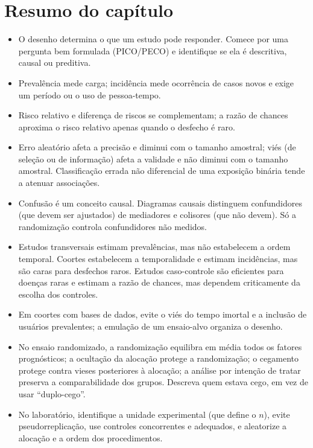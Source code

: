 \documentclass[
]{book}
\providecommand{\tightlist}{%
  \setlength{\itemsep}{0pt}\setlength{\parskip}{0pt}}
\begin{document}
\section{Resumo do capítulo}\label{resumo-do-capuxedtulo-2}

\begin{itemize}
\tightlist
\item
  O desenho determina o que um estudo pode responder. Comece por uma pergunta bem formulada (PICO/PECO) e identifique se ela é descritiva, causal ou preditiva.
\item
  Prevalência mede carga; incidência mede ocorrência de casos novos e exige um período ou o uso de pessoa-tempo.
\item
  Risco relativo e diferença de riscos se complementam; a razão de chances aproxima o risco relativo apenas quando o desfecho é raro.
\item
  Erro aleatório afeta a precisão e diminui com o tamanho amostral; viés (de seleção ou de informação) afeta a validade e não diminui com o tamanho amostral. Classificação errada não diferencial de uma exposição binária tende a atenuar associações.
\item
  Confusão é um conceito causal. Diagramas causais distinguem confundidores (que devem ser ajustados) de mediadores e colisores (que não devem). Só a randomização controla confundidores não medidos.
\item
  Estudos transversais estimam prevalências, mas não estabelecem a ordem temporal. Coortes estabelecem a temporalidade e estimam incidências, mas são caras para desfechos raros. Estudos caso-controle são eficientes para doenças raras e estimam a razão de chances, mas dependem criticamente da escolha dos controles.
\item
  Em coortes com bases de dados, evite o viés do tempo imortal e a inclusão de usuários prevalentes; a emulação de um ensaio-alvo organiza o desenho.
\item
  No ensaio randomizado, a randomização equilibra em média todos os fatores prognósticos; a ocultação da alocação protege a randomização; o cegamento protege contra vieses posteriores à alocação; a análise por intenção de tratar preserva a comparabilidade dos grupos. Descreva quem estava cego, em vez de usar ``duplo-cego''.
\item
  No laboratório, identifique a unidade experimental (que define o \(n\)), evite pseudorreplicação, use controles concorrentes e adequados, e aleatorize a alocação e a ordem dos procedimentos.
\end{itemize}
\end{document}
